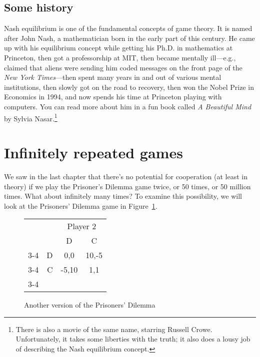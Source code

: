 



\subsection*{Some history}

Nash equilibrium is one of the fundamental concepts of game theory. It is named after John Nash, a mathematician born in the early part of this century. He came up with his equilibrium concept while getting his Ph.D. in mathematics at Princeton, then got a professorship at MIT, then became mentally ill---e.g., claimed that aliens were sending him coded messages on the front page of the \emph{New York Times}---then spent many years in and out of various mental institutions, then slowly got on the road to recovery, then won the Nobel Prize in Economics in 1994, and now spends his time at Princeton playing with computers. You can read more about him in a fun book called \textit{A Beautiful Mind} by Sylvia Nasar.\footnote{There is also a movie of the same name, starring Russell Crowe. Unfortunately, it takes some liberties with the truth; it also does a lousy job of describing the Nash equilibrium concept.}








\section{Infinitely repeated games}
\label{infinitecooperation}

We saw in the last chapter that there's no potential for cooperation (at least in theory) if we play the Prisoner's Dilemma game twice, or 50 times, or 50 million times. What about infinitely many times? To examine this possibility, we will look at the Prisoners' Dilemma game in Figure~\ref{game:prisoner2}.


\begin{figure}[!b]
\begin{center}
\begin{tabular}{crcc}
& & \multicolumn{2}{c}{Player 2} \\ [.15cm]
& & D & C \\ \cline{3-4}
\multirow{2}{1.5cm}{Player 1} & D & \multicolumn{1}{|c|}{0,0} & \multicolumn{1}{c|}{10,-5} \\ \cline{3-4}
                   & C & \multicolumn{1}{|c|}{-5,10} & \multicolumn{1}{c|}{1,1} \\ \cline{3-4}
\end{tabular}
\end{center}
\caption{Another version of the Prisoners' Dilemma}
\label{game:prisoner2} %
\end{figure}

